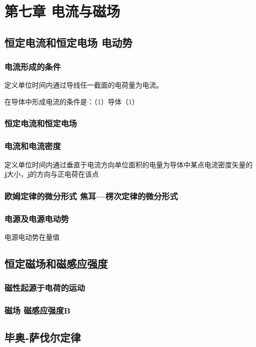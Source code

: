 \chapter{第七章 电流与磁场}

\section{恒定电流和恒定电场 电动势}
    \subsection{电流形成的条件}
    定义单位时间内通过导线任一截面的电荷量为电流。

    在导体中形成电流的条件是：（1）导体（1）
    \subsection{恒定电流和恒定电场}
    \subsection{电流和电流密度}
    定义单位时间内通过垂直于电流方向单位面积的电量为导体中某点电流密度矢量的$\boldsymbol{j}$大小，$\boldsymbol{j}$的方向与正电荷在该点
    \subsection{欧姆定律的微分形式 焦耳—楞次定律的微分形式}
    \subsection{电源及电源电动势}
    电源电动势在量值

\section{恒定磁场和磁感应强度}
    \subsection{磁性起源于电荷的运动}
    \subsection{磁场 磁感应强度\texorpdfstring{$\boldsymbol{B}$}{B}}

\section{毕奥‑萨伐尔定律}
